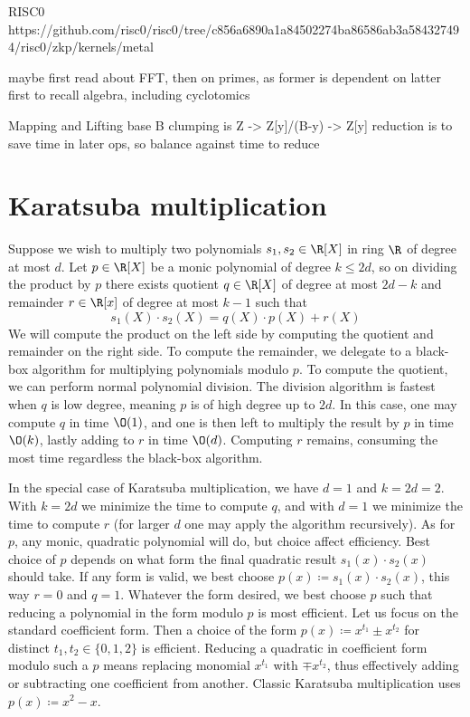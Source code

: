 RISC0
    https://github.com/risc0/risc0/tree/c856a6890a1a84502274ba86586ab3a584327494/risc0/zkp/kernels/metal

maybe first read about FFT, then on primes, as former is dependent on latter
first to recall algebra, including cyclotomics



Mapping and Lifting
base B clumping is Z -> Z[y]/(B-y) -> Z[y]
reduction is to save time in later ops, so balance against time to reduce

\section{Karatsuba multiplication}
Suppose we wish to multiply two polynomials $s_1,s_2\in\R[X]$ in ring $\R$ of degree at most $d$.
Let $p\in\R[X]$ be a monic polynomial of degree $k\leq 2d$, so on dividing the product by $p$ there exists quotient $q\in\R[X]$ of degree at most $2d-k$ and remainder $r\in\R[x]$ of degree at most $k-1$ such that
\begin{equation}
    s_1(X)\cdot s_2(X) = q(X)\cdot p(X) + r(X)
\end{equation}
We will compute the product on the left side by computing the quotient and remainder on the right side.
To compute the remainder, we delegate to a black-box algorithm for multiplying polynomials modulo $p$.
To compute the quotient, we can perform normal polynomial division.
The division algorithm is fastest when $q$ is low degree, meaning $p$ is of high degree up to $2d$.
In this case, one may compute $q$ in time $\O(1)$, and one is then left to multiply the result by $p$ in time $\O(k)$, lastly adding to $r$ in time $\O(d)$.
Computing $r$ remains, consuming the most time regardless the black-box algorithm.

In the special case of Karatsuba multiplication, we have $d=1$ and $k=2d=2$.
With $k=2d$ we minimize the time to compute $q$, and with $d=1$ we minimize the time to compute $r$ (for larger $d$ one may apply the algorithm recursively).
As for $p$, any monic, quadratic polynomial will do, but choice affect efficiency.
Best choice of $p$ depends on what form the final quadratic result $s_1(x)\cdot s_2(x)$ should take.
If any form is valid, we best choose $p(x)\coloneq s_1(x)\cdot s_2(x)$, this way $r=0$ and $q=1$.
Whatever the form desired, we best choose $p$ such that reducing a polynomial in the form modulo $p$ is most efficient.
Let us focus on the standard coefficient form.
Then a choice of the form $p(x)\coloneq x^{t_1}\pm x^{t_2}$ for distinct $t_1,t_2\in\{0,1,2\}$ is efficient.
Reducing a quadratic in coefficient form modulo such a $p$ means replacing monomial $x^{t_1}$ with $\mp x^{t_2}$, thus effectively adding or subtracting one coefficient from another.
Classic Karatsuba multiplication uses $p(x)\coloneq x^2-x$.

